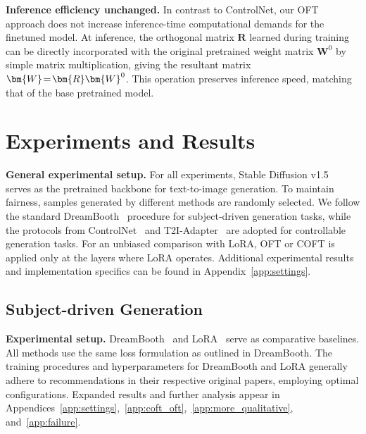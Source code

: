 \textbf{Inference efficiency unchanged.} In contrast to ControlNet, our OFT approach does not increase inference-time computational demands for the finetuned model. At inference, the orthogonal matrix $\bm{R}$ learned during training can be directly incorporated with the original pretrained weight matrix $\bm{W}^0$ by simple matrix multiplication, giving the resultant matrix $\thickmuskip=2mu \medmuskip=2mu \bm{W}=\bm{R}\bm{W}^0$. This operation preserves inference speed, matching that of the base pretrained model.

\section{Experiments and Results}

\textbf{General experimental setup.} For all experiments, Stable Diffusion v1.5~\cite{rombach2022high} serves as the pretrained backbone for text-to-image generation. To maintain fairness, samples generated by different methods are randomly selected. We follow the standard DreamBooth~\cite{ruiz2023dreambooth} procedure for subject-driven generation tasks, while the protocols from ControlNet~\cite{zhang2023adding} and T2I-Adapter~\cite{mou2023t2i} are adopted for controllable generation tasks. For an unbiased comparison with LoRA, OFT or COFT is applied only at the layers where LoRA operates. Additional experimental results and implementation specifics can be found in Appendix~\ref{app:settings}.

\subsection{Subject-driven Generation}

\textbf{Experimental setup.} DreamBooth~\cite{ruiz2023dreambooth} and LoRA~\cite{hulora2022} serve as comparative baselines. All methods use the same loss formulation as outlined in DreamBooth. The training procedures and hyperparameters for DreamBooth and LoRA generally adhere to recommendations in their respective original papers, employing optimal configurations. Expanded results and further analysis appear in Appendices~\ref{app:settings},~\ref{app:coft_oft},~\ref{app:more_qualitative}, and~\ref{app:failure}.

